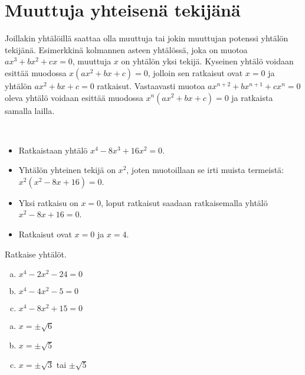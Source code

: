 \section{Muuttuja yhteisenä tekijänä}

Joillakin yhtälöillä saattaa olla muuttuja tai jokin muuttujan potenssi yhtälön tekijänä. Esimerkkinä kolmannen asteen yhtälössä, joka on muotoa \\ $ax^3+bx^2+cx=0$, muuttuja $x$ on yhtälön yksi tekijä. Kyseinen yhtälö voidaan esittää muodossa $x(ax^2+bx+c)=0$, jolloin sen ratkaisut ovat $x=0$ ja yhtälön $ax^2+bx+c=0$ ratkaisut. Vastaavasti muotoa $ax^{n+2}+bx^{n+1}+cx^n=0$ oleva yhtälö voidaan esittää muodossa $x^n(ax^2+bx+c)=0$ ja ratkaista samalla lailla.

\begin{esimerkki}{\ }
\begin{itemize}
    \item Ratkaistaan yhtälö $x^4-8x^3+16x^2=0$.
    \item Yhtälön yhteinen tekijä on $x^2$, joten muotoillaan se irti muista termeistä: $x^2(x^2-8x+16)=0$.
    \item Yksi ratkaisu on $x=0$, loput ratkaisut saadaan ratkaisemalla yhtälö \\ $x^2-8x+16=0$.
    \item Ratkaisut ovat $x=0$ ja $x=4$.

\end{itemize}
\end{esimerkki}

\Harjoitustehtavat

\begin{tehtava}
    Ratkaise yhtälöt.
    \begin{enumerate}[a)]
        \item $x^4 - 2x^2 - 24 = 0$
        \item $x^4 - 4x^2 - 5 = 0$
        \item $x^4 - 8x^2 + 15 = 0$
    \end{enumerate}
    \begin{vastaus}
        \begin{enumerate}[a)]
            \item $x = \pm\sqrt{6}$
            \item $x = \pm\sqrt{5}$
            \item $x = \pm\sqrt{3}$ tai $\pm\sqrt{5}$
        \end{enumerate}
    \end{vastaus}
\end{tehtava}

